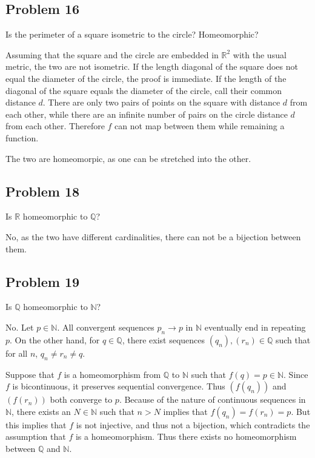 \documentclass{article}
\begin{document}
\subsection*{Problem 16}

Is the perimeter of a square isometric to the circle?  Homeomorphic?

Assuming that the square and the circle are embedded in $\mathbb{R}^2$ with the usual metric, the two are not isometric. If the length diagonal of the square does not equal the diameter of the circle, the proof is immediate. If the length of the diagonal of the square equals the diameter of the circle, call their common distance $d$. There are only two pairs of points on the square with distance $d$ from each other, while there are an infinite number of pairs on the circle distance $d$ from each other. Therefore $f$ can not map between them while remaining a function.

The two are homeomorpic, as one can be stretched into the other.

\subsection*{Problem 18}

Is $\mathbb{R}$ homeomorphic to $\mathbb{Q}$?

No, as the two have different cardinalities, there can not be a bijection between them.

\subsection*{Problem 19}

Is $\mathbb{Q}$ homeomorphic to $\mathbb{N}$?

No. Let $p \in \mathbb{N}$. All convergent sequences $p_n \rightarrow p$ in $\mathbb{N}$ eventually end in repeating $p$. On the other hand, for $q \in \mathbb{Q}$, there exist sequences $(q_n), (r_n) \in \mathbb{Q}$ such that for all $n$, $q_n \neq r_n \neq q$.

Suppose that $f$ is a homeomorphism from $\mathbb{Q}$ to $\mathbb{N}$ such that $f(q) = p \in \mathbb{N}$.  Since $f$ is bicontinuous, it preserves sequential convergence. Thus $(f(q_n))$ and $(f(r_n))$ both converge to $p$. Because of the nature of continuous sequences in $\mathbb{N}$, there exists an $N \in \mathbb{N}$ such that $n > N$ implies that $f(q_n) = f(r_n) = p$. But this implies that $f$ is not injective, and thus not a bijection, which contradicts the assumption that $f$ is a homeomorphism. Thus there exists no homeomorphism between $\mathbb{Q}$ and $\mathbb{N}$.
\end{document}
